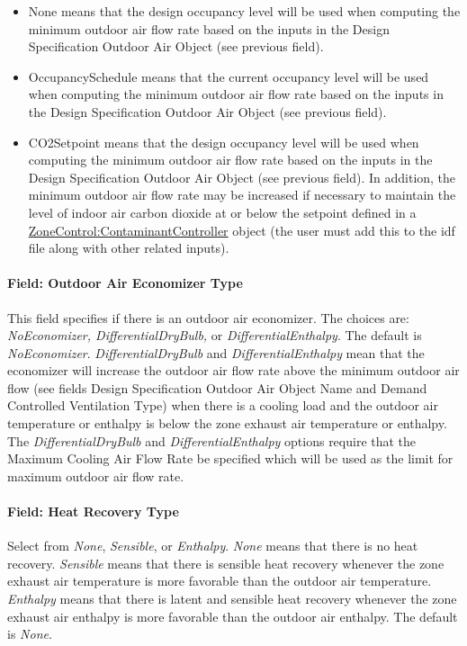 \begin{itemize}
\item
  None means that the design occupancy level will be used when computing the minimum outdoor air flow rate based on the inputs in the Design Specification Outdoor Air Object (see previous field).
\item
  OccupancySchedule means that the current occupancy level will be used when computing the minimum outdoor air flow rate based on the inputs in the Design Specification Outdoor Air Object (see previous field).
\item
  CO2Setpoint means that the design occupancy level will be used when computing the minimum outdoor air flow rate based on the inputs in the Design Specification Outdoor Air Object (see previous field). In addition, the minimum outdoor air flow rate may be increased if necessary to maintain the level of indoor air carbon dioxide at or below the setpoint defined in a \hyperref[zonecontrolcontaminantcontroller]{ZoneControl:ContaminantController} object (the user must add this to the idf file along with other related inputs).
\end{itemize}

\paragraph{Field: Outdoor Air Economizer Type}\label{field-outdoor-air-economizer-type}

This field specifies if there is an outdoor air economizer. The choices are: \emph{NoEconomizer, DifferentialDryBulb,} or \emph{DifferentialEnthalpy}. The default is \emph{NoEconomizer}. \emph{DifferentialDryBulb} and \emph{DifferentialEnthalpy} mean that the economizer will increase the outdoor air flow rate above the minimum outdoor air flow (see fields Design Specification Outdoor Air Object Name and Demand Controlled Ventilation Type) when there is a cooling load and the outdoor air temperature or enthalpy is below the zone exhaust air temperature or enthalpy. The \emph{DifferentialDryBulb} and \emph{DifferentialEnthalpy} options require that the Maximum Cooling Air Flow Rate be specified which will be used as the limit for maximum outdoor air flow rate.

\paragraph{Field: Heat Recovery Type}\label{field-heat-recovery-type}

Select from \emph{None}, \emph{Sensible}, or \emph{Enthalpy}. \emph{None} means that there is no heat recovery. \emph{Sensible} means that there is sensible heat recovery whenever the zone exhaust air temperature is more favorable than the outdoor air temperature. \emph{Enthalpy} means that there is latent and sensible heat recovery whenever the zone exhaust air enthalpy is more favorable than the outdoor air enthalpy. The default is \emph{None}.

